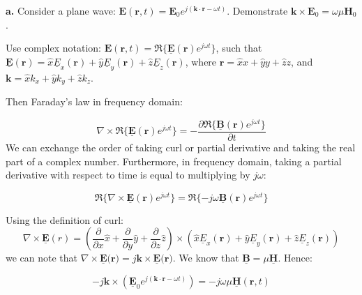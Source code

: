 \documentclass[11pt,a4paper]{article}
\begin{document}
\begin{displayquote}
    \textbf{a.} Consider a plane wave: $\textbf{E}(\textbf{r},t)=\textbf{E}_{0}e^{j(\textbf{k}\cdot\textbf{r}-\omega{}t)}$. Demonstrate $\textbf{k}\times\textbf{E}_0=\omega\mu\textbf{H}_0$.
\end{displayquote}

 Use complex notation: $\textbf{E}(\textbf{r},t)=\Re{\{\underline{\textbf{E}}(\textbf{r})e^{j\omega{}t}}\}$, such that $\underline{\textbf{E}}(\textbf{r})=\hat{x}\underline{E}_x(\textbf{r})+\hat{y}\underline{E}_y(\textbf{r})+\hat{z}\underline{E}_z(\textbf{r})$, where $\textbf{r}=\hat{x}x+\hat{y}y+\hat{z}z$, and $\textbf{k}=\hat{x}k_x+\hat{y}k_y+\hat{z}k_z$.

 Then Faraday's law in frequency domain:

 \begin{equation}
     \nabla\times\Re{\{\underline{\textbf{E}}(\textbf{r})e^{j\omega{}t}}\}=-\frac{\partial\Re{\{\underline{\textbf{B}}(\textbf{r})e^{j\omega{}t}}\}}{\partial{t}}
 \end{equation}
We can exchange the order of taking curl or partial derivative and taking the real part of a complex number. Furthermore, in frequency domain, taking a partial derivative with respect to time is equal to multiplying by $j\omega$:

\begin{equation}
    \Re{\{\nabla\times\underline{\textbf{E}}(\textbf{r})e^{j\omega{}t}\}}=\Re{\{-j\omega\underline{\textbf{B}}(\textbf{r})e^{j\omega{}t}\}}
\end{equation}

Using the definition of curl:
\begin{equation*}
    \nabla\times\underline{\textbf{E}}(r)=(\frac{\partial}{\partial{x}}\hat{x}+\frac{\partial}{\partial{y}}\hat{y}+\frac{\partial}{\partial{z}}\hat{z})\times(\hat{x}\underline{E}_x(\textbf{r})+\hat{y}\underline{E}_y(\textbf{r})+\hat{z}\underline{E}_z(\textbf{r}))
\end{equation*}
we can note that $\nabla\times\underline{\textbf{E}}(\textbf{r)}=j\textbf{k}\times\underline{\textbf{E}}(\textbf{r)}$. We know that $\underline{\textbf{B}}=\mu\underline{\textbf{H}}$. Hence:

\begin{equation}
      -j\textbf{k}\times(\underline{\textbf{E}}_{0}e^{j(\textbf{k}\cdot\textbf{r}-\omega{}t)})=-j\omega\mu\underline{\textbf{H}}(\textbf{r},t)
\end{equation}
\end{document}
